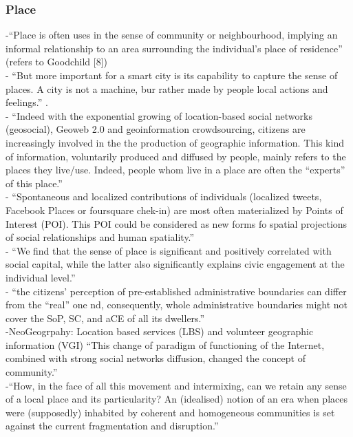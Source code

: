 \subsubsection{Place}
-{\color{orange}“Place is often uses in the sense of community or neighbourhood, implying an informal relationship to an area surrounding the individual’s place of residence” (refers to Goodchild [8])} \cite{Roche2012}\\
- {\color{orange}“But more important for a smart city is its capability to capture the sense of places. A city is not a machine, bur rather made by people local actions and feelings.” \cite{Oliveira2021}}.\\
- {\color{orange}  “Indeed with the exponential growing of location-based social networks (geosocial), Geoweb 2.0 and geoinformation crowdsourcing, citizens are increasingly involved in the the production of geographic information. This kind of information, voluntarily produced and diffused by people, mainly refers to the places they live/use. Indeed, people whom live in a place are often the “experts” of this place.”} \cite{Roche2012}\\
- {\color{orange} “Spontaneous and localized contributions of individuals (localized tweets, Facebook Places or foursquare chek-in) are most often materialized by Points of Interest (POI). This POI could be considered as new forms fo spatial projections of social relationships and human spatiality.”} \cite{Roche2012}\\
- {\color{orange} “We find that the sense of place is significant and positively correlated with social capital, while the latter also significantly explains civic engagement at the individual level.”} \cite{Acedo2019}\\
-{\color{orange} “the citizens’ perception of pre-established administrative boundaries can differ from the “real” one nd, consequently, whole administrative boundaries might not cover the SoP, SC, and aCE of all its dwellers.”} \cite{Acedo2019}\\
-{\color{orange}NeoGeogrpahy: Location based services (LBS) and volunteer geographic information (VGI) “This change of paradigm of functioning of the Internet, combined with strong social networks diffusion, changed the concept of community.”} \cite{Painho2013}\\
-{\color{orange}“How, in the face of all this movement and intermixing, can we retain any sense of a local place and its particularity? An (idealised) notion of an era when places were (supposedly) inhabited by coherent and homogeneous communities is set against the current fragmentation and disruption.”}\cite{MasseyD1991}\\
